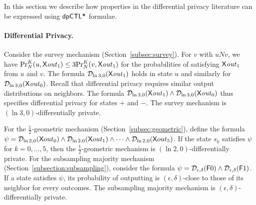 In this section we describe how properties in the differential privacy literature can be expressed using $\dpCTLstar$ formulae.

\paragraph{Differential Privacy.}
Consider the survey mechanism (Section~\ref{subsec:survey}). For  $v$
with $u N v$, we have $\myPr{u}{K}{N}{\X \mathit{out}_1}\le
3\myPr{v}{K}{N}{\X \mathit{out}_1}$ for the probabilities of satisfying
$\X \mathit{out}_1$ from $u$ and $v$.
The formula $\dpriv{\ln 3}{0} (\X \mathit{out}_1)$ holds in state $u$
and similarly for $\dpriv{\ln 3}{0} (\X \mathit{out}_0)$. 
Recall that differential privacy requires similar output distributions
on neighbors. The formula $\dpriv{\ln 3}{0} (\X
\mathit{out}_1)\wedge \dpriv{\ln 3}{0} (\X \mathit{out}_0)$ thus
specifies differential privacy for states $+$ and $-$. 
The survey mechanism is $(\ln 3, 0)$-differentially private.



For the $\frac{1}{2}$-geometric mechanism (Section~\ref{subsec:geometric}),
define the formula
$\psi = \dpriv{\ln 2}{0} (\X out_0) \wedge \dpriv{\ln 2}{0} (\X out_1) \wedge
\cdots \wedge \dpriv{\ln 2}{0} (\X out_5)$. If the state $s_k$ satisfies
$\psi$ for $k = 0, \ldots, 5$, then the $\frac{1}{2}$-geometric mechanism is
$(\ln 2, 0)$-differentially private. For the subsampling majority
mechanism (Section~\ref{subsection:subsampling}), consider the formula
$\psi = \dpriv{\epsilon}{\delta} (\F 0) \wedge
\dpriv{\epsilon}{\delta} (\F 1)$. If a state satisfies $\psi$, its
probability of 
outputting is $(\epsilon, \delta)$-close to those of its
neighbor for every outcomes. The subsampling majority
mechanism is $(\epsilon, \delta)$-differentially private.



